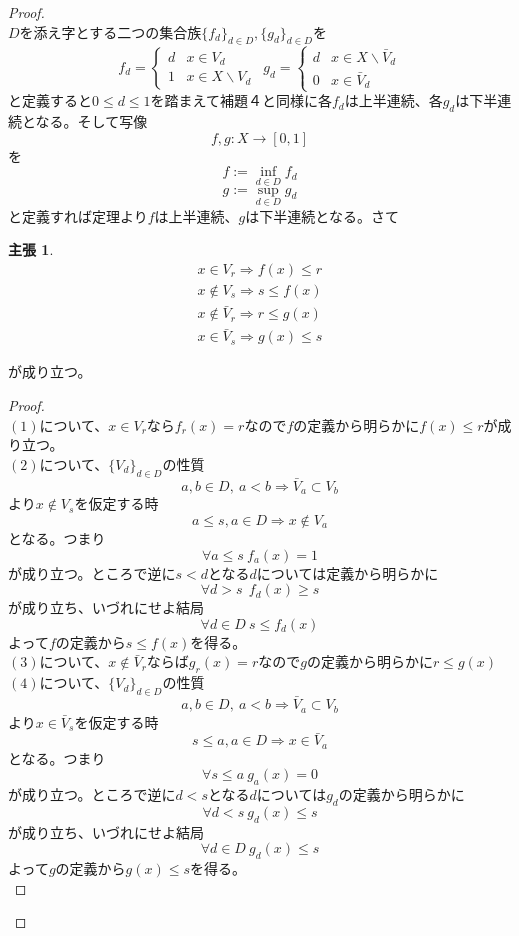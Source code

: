 \documentclass{jsarticle}
\newtheorem*{claim}{主張}
\begin{document}
\begin{proof}${}$\\ 
$D$を添え字とする二つの集合族$\{f_d\}_{d\in D}, \{g_d\}_{d\in D}$を
\[
f_d=\begin{cases}
 d & \text{$x\in V_d$} \\
 1 & \text{$x\in X\backslash V_d$}
\end{cases}\ \ 
g_d=\begin{cases}
 d & \text{$x\in X\backslash \bar{V}_d$} \\
 0 & \text{$x\in \bar{V}_d$}
\end{cases}
\]
と定義すると$0\le d \le1$を踏まえて補題４と同様に各$f_d$は上半連続、各$g_d$は下半連続となる。そして写像
\[
f,g:X \rightarrow [0,1]
\]を
\[
f:=\inf_{d\in D}f_d\]
\[g:=\sup_{d\in D}g_d
\]と定義すれば定理より$f$は上半連続、$g$は下半連続となる。さて
\begin{claim}
\begin{eqnarray}
x\in V_r\Rightarrow f(x)\le r\\ 
x\not\in V_s\Rightarrow s\le f(x)\\ 
x\not\in \bar{V}_r\Rightarrow r\le g(x)\\ 
x\in \bar{V}_s\Rightarrow g(x)\le s
\end{eqnarray}
\end{claim}が成り立つ。\
\begin{proof}${}$\\ 
$(1)$について、$x\in V_r$なら$f_r(x)=r$なので$f$の定義から明らかに$f(x)\le r$が成り立つ。\\ 
$(2)$について、$\{V_d\}_{d\in D}$の性質
\[
a,b\in D,\ a<b\Rightarrow \bar{V}_a\subset V_b
\]
より$x\not\in V_s$を仮定する時
\[
a\le s,a\in D\Rightarrow x\not\in V_a
\]
となる。つまり
\[
\forall a\le s\ f_a(x)=1
\]が成り立つ。ところで逆に$s<d$となる$d$については定義から明らかに
\[
\forall d>s\ \ f_d(x)\ge s
\]
が成り立ち、いづれにせよ結局
\[
\forall d\in D\ s\le f_{d}(x)
\]よって$f$の定義から$s\le f(x)$を得る。\\ 
$(3)$について、$x\not\in \bar{V}_r$ならば$g_r(x)=r$なので$g$の定義から明らかに$r\le g(x)$\\ 
$(4)$について、$\{V_d\}_{d\in D}$の性質
\[
a,b\in D,\ a<b\Rightarrow \bar{V}_a\subset V_b
\]
より$x\in \bar{V}_s$を仮定する時
\[
s\le a,a\in D\Rightarrow x\in \bar{V}_a
\]
となる。つまり
\[
\forall s\le a\ g_a(x)=0
\]が成り立つ。ところで逆に$d<s$となる$d$については$g_d$の定義から明らかに
\[
\forall d<s\ g_d(x)\le s
\]
が成り立ち、いづれにせよ結局
\[
\forall d\in D\ g_{d}(x)\le s
\]よって$g$の定義から$g(x)\le s$を得る。\\ 


\end{proof}
\end{proof}
\end{document}
